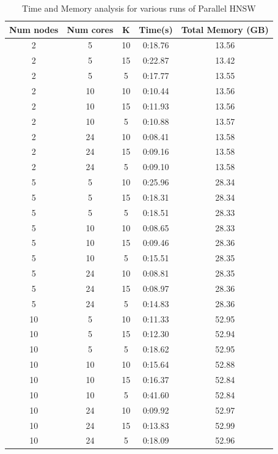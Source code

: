 \documentclass[hidelinks,12pt]{article}
\begin{document}
\begin{table}
  \centering
  \begin{tabular}{|c|c|c|c|c|}
    \hline

    Num nodes & Num cores & K  & Time(s) & Total Memory (GB) \\ \hline
    2         & 5         & 10 & 0:18.76 & 13.56             \\
    2         & 5         & 15 & 0:22.87 & 13.42             \\
    2         & 5         & 5  & 0:17.77 & 13.55             \\
    2         & 10        & 10 & 0:10.44 & 13.56             \\
    2         & 10        & 15 & 0:11.93 & 13.56             \\
    2         & 10        & 5  & 0:10.88 & 13.57             \\
    2         & 24        & 10 & 0:08.41 & 13.58             \\
    2         & 24        & 15 & 0:09.16 & 13.58             \\
    2         & 24        & 5  & 0:09.10 & 13.58             \\
    5         & 5         & 10 & 0:25.96 & 28.34             \\
    5         & 5         & 15 & 0:18.31 & 28.34             \\
    5         & 5         & 5  & 0:18.51 & 28.33             \\
    5         & 10        & 10 & 0:08.65 & 28.33             \\
    5         & 10        & 15 & 0:09.46 & 28.36             \\
    5         & 10        & 5  & 0:15.51 & 28.35             \\
    5         & 24        & 10 & 0:08.81 & 28.35             \\
    5         & 24        & 15 & 0:08.97 & 28.36             \\
    5         & 24        & 5  & 0:14.83 & 28.36             \\
    10        & 5         & 10 & 0:11.33 & 52.95             \\
    10        & 5         & 15 & 0:12.30 & 52.94             \\
    10        & 5         & 5  & 0:18.62 & 52.95             \\
    10        & 10        & 10 & 0:15.64 & 52.88             \\
    10        & 10        & 15 & 0:16.37 & 52.84             \\
    10        & 10        & 5  & 0:41.60 & 52.84             \\
    10        & 24        & 10 & 0:09.92 & 52.97             \\
    10        & 24        & 15 & 0:13.83 & 52.99             \\
    10        & 24        & 5  & 0:18.09 & 52.96             \\

    \hline
  \end{tabular}
  \caption{Time and Memory analysis for various runs of Parallel HNSW}
\end{table}
\end{document}
